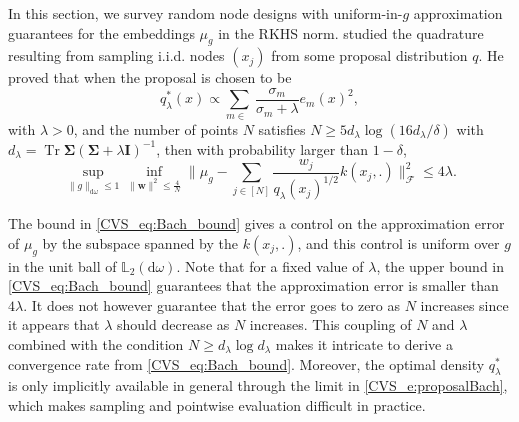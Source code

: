 \documentclass[twoside,11pt]{book}
\numberwithin{theorem}{chapter}
\numberwithin{definition}{chapter}
\numberwithin{proposition}{chapter}
\numberwithin{corollary}{chapter}
\numberwithin{example}{chapter}
\numberwithin{lemma}{chapter}
\DeclareMathOperator{\Tr}{Tr}
\DeclareMathOperator{\Ns}{\mathbb{N}^{*}}
\newcommand{\pc}[1]{\textcolor{blue}{#1}}
\newcommand{\rb}[1]{\textcolor{magenta}{#1}}
\begin{document}
In this section, we survey random node designs with uniform-in-$g$ approximation guarantees for the embeddings $\mu_{g}$ in the RKHS norm.
\cite{Bac17} studied the quadrature resulting from sampling i.i.d. nodes $(x_j)$ from some proposal distribution $q$. He proved that when the proposal is chosen to be
\begin{equation}
	q_{\lambda}^*(x) \propto \sum\limits_{m \in \Ns} \frac{\sigma_{m}}{\sigma_{m}+\lambda} e_{m}(x)^{2},
\label{CVS_e:proposalBach}
\end{equation}
with $\lambda >0$,
and the number of points $N$ satisfies $N \geq 5 d_\lambda \log(16 d_\lambda / \delta)$ with $d_\lambda = \Tr \bm{\Sigma}(\bm{\Sigma} + \lambda \bm{I})^{-1}$, then with probability larger than $1-\delta$,
\begin{equation}\label{CVS_eq:Bach_bound}
\sup\limits_{\|g\|_{\mathrm{d}\omega} \leq 1} \inf\limits_{ \|\bm{w}\|^{2}\leq \frac{4}{N}} \Big\| \mu_{g} - \sum\limits_{j \in [N]} \frac{w_{j}}{q_\lambda(x_{j})^{1/2}} k(x_{j},.)\Big\|_{\mathcal{F}}^{2} \leq 4\lambda .
\end{equation}

The bound in \eqref{CVS_eq:Bach_bound} gives a control on the approximation error of $\mu_{g}$ by the subspace spanned by the $k(x_{j},.)$, and this control is uniform over $g$ in the unit ball of $\mathbb{L}_{2}(\mathrm{d}\omega)$.
Note that for a fixed value of $\lambda$, the upper bound in \eqref{CVS_eq:Bach_bound} guarantees that the approximation error is smaller than $4\lambda$. It does not however guarantee that the error goes to zero as $N$ increases since it appears that $\lambda$ should decrease as $N$ increases.
This coupling of $N$ and $\lambda$ combined with the condition $N \geq d_{\lambda} \log d_{\lambda}$ makes it intricate to derive a convergence rate from \eqref{CVS_eq:Bach_bound}.
 Moreover, the optimal density $q_{\lambda}^*$ is only implicitly available in general through the limit in \eqref{CVS_e:proposalBach}, which makes sampling and pointwise evaluation difficult in practice.
\end{document}
